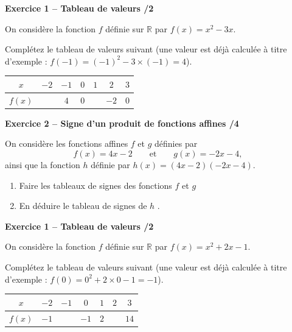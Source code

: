 \documentclass[10pt,a4paper]{article}
\begin{document}
\begin{sujets}


\textbf{Exercice 1 -- Tableau de valeurs \hfill /2}

On considère la fonction \(f\) définie sur \(\mathbb{R}\) par \(f(x)=x^2-3x\).

Complétez le tableau de valeurs suivant (une valeur est déjà calculée à titre d'exemple : \(f(-1)=(-1)^2-3\times(-1)=4\)).

\begin{center}
    \renewcommand{\arraystretch}{1.5}
    \setlength{\tabcolsep}{0.25cm}
    \begin{tabular}{|*{7}{c|}}
    \hline
    \(x\) & \(-2\) & \(-1\) & \(0\) & \(1\) & \(2\) & \(3\) \\
    \hline
    \(f(x)\) & & \(4\) & \(0\) & & \(-2\) & \(0\) \\
    \hline
    \end{tabular}
\end{center}

\textbf{Exercice 2 -- Signe d'un produit de fonctions affines \hfill /4}

On considère les fonctions affines \(f\) et \(g\) définies par
\[
f(x)=4x-2 \qquad\text{et}\qquad g(x)=-2x-4,
\]
ainsi que la fonction \(h\) définie  par \(h(x)=(4x-2)(-2x-4)\).

\begin{enumerate}
\item Faire les tableaux de signes des fonctions \(f\) et \(g\)

\vspace{4cm}

\item En déduire le tableau de signes de \(h\) .

\vspace{4cm}

\end{enumerate}

\text{ }
\columnbreak


\textbf{Exercice 1 -- Tableau de valeurs \hfill /2}

On considère la fonction \(f\) définie sur \(\mathbb{R}\) par \(f(x)=x^2+2x-1\).

Complétez le tableau de valeurs suivant (une valeur est déjà calculée à titre d'exemple : \(f(0)=0^2+2\times 0-1=-1\)).

\begin{center}
    \renewcommand{\arraystretch}{1.5}
    \setlength{\tabcolsep}{0.25cm}
    \begin{tabular}{|*{7}{c|}}
    \hline
    \(x\) & \(-2\) & \(-1\) & \(0\) & \(1\) & \(2\) & \(3\) \\
    \hline
    \(f(x)\) & \(-1\) & & \(-1\) & \(2\) & & \(14\) \\
    \hline
    \end{tabular}
\end{center}


\end{sujets}
\end{document}
